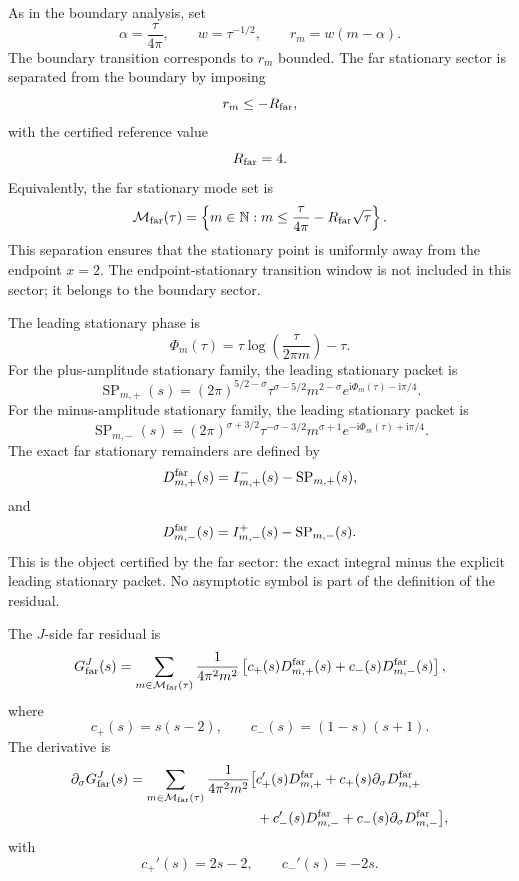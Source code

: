\documentclass[11pt]{article}
\newcommand{\ii}{\mathrm{i}}
\newcommand{\s}{s}
\newcommand{\sig}{\sigma}
\newcommand{\tauh}{\tau}
\begin{document}
As in the boundary analysis, set
\[
        \alpha=\frac{\tauh}{4\pi},
        \qquad
        w=\tauh^{-1/2},
        \qquad
        r_m=w(m-\alpha).
\]
The boundary transition corresponds to \(r_m\) bounded.  The far stationary
sector is separated from the boundary by imposing
\[
        r_m\le -R_{\rm far},
\]
with the certified reference value
\[
        R_{\rm far}=4.
\]
Equivalently, the far stationary mode set is
\[
        \mathcal M_{\rm far}(\tauh)
        =
        \left\{
            m\in\mathbb N:
            m\le
            \frac{\tauh}{4\pi}
            -
            R_{\rm far}\sqrt{\tauh}
        \right\}.
\]
This separation ensures that the stationary point is uniformly away from the
endpoint \(x=2\).  The endpoint-stationary transition window is not included in
this sector; it belongs to the boundary sector.

The leading stationary phase is
\[
        \Phi_m(\tauh)
        =
        \tauh\log\left(\frac{\tauh}{2\pi m}\right)-\tauh.
\]
For the plus-amplitude stationary family, the leading stationary packet is
\[
        \operatorname{SP}_{m,+}(\s)
        =
        (2\pi)^{5/2-\sig}
        \tauh^{\sig-5/2}
        m^{2-\sig}
        e^{\ii\Phi_m(\tauh)-\ii\pi/4}.
\]
For the minus-amplitude stationary family, the leading stationary packet is
\[
        \operatorname{SP}_{m,-}(\s)
        =
        (2\pi)^{\sig+3/2}
        \tauh^{-\sig-3/2}
        m^{\sig+1}
        e^{-\ii\Phi_m(\tauh)+\ii\pi/4}.
\]
The exact far stationary remainders are defined by
\[
        D_{m,+}^{\rm far}(\s)
        =
        I_{m,+}^{-}(\s)
        -
        \operatorname{SP}_{m,+}(\s),
\]
and
\[
        D_{m,-}^{\rm far}(\s)
        =
        I_{m,-}^{+}(\s)
        -
        \operatorname{SP}_{m,-}(\s).
\]
This is the object certified by the far sector: the exact integral minus the
explicit leading stationary packet.  No asymptotic symbol is part of the
definition of the residual.

The \(J\)-side far residual is
\[
        G_{\rm far}^{J}(\s)
        =
        \sum_{m\in\mathcal M_{\rm far}(\tauh)}
        \frac{1}{4\pi^2m^2}
        \left[
            c_+(\s)D_{m,+}^{\rm far}(\s)
            +
            c_-(\s)D_{m,-}^{\rm far}(\s)
        \right],
\]
where
\[
        c_+(\s)=\s(\s-2),
        \qquad
        c_-(\s)=(1-\s)(\s+1).
\]
The derivative is
\[
\begin{aligned}
        \partial_\sig G_{\rm far}^{J}(\s)
        =
        \sum_{m\in\mathcal M_{\rm far}(\tauh)}
        \frac{1}{4\pi^2m^2}
        \big[
            &c_+'(\s)D_{m,+}^{\rm far}
            +
            c_+(\s)\partial_\sig D_{m,+}^{\rm far}
            \\
            &+
            c_-'(\s)D_{m,-}^{\rm far}
            +
            c_-(\s)\partial_\sig D_{m,-}^{\rm far}
        \big],
\end{aligned}
\]
with
\[
        c_+'(\s)=2\s-2,
        \qquad
        c_-'(\s)=-2\s.
\]
\end{document}
